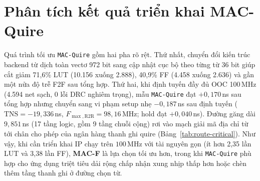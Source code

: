 \section{Phân tích kết quả triển khai MAC-Quire}

Quá trình tối ưu \texttt{MAC-Quire} gồm hai pha rõ rệt. Thứ nhất, chuyển đổi kiến
trúc backend từ dịch toàn vectơ 972 bit sang cập nhật cục bộ theo từng từ 36 bit
giúp cắt giảm 71,6\% LUT (10.156 xuống 2.888), 40,9\% FF (4.458 xuống 2.636) và
gần một nửa độ trễ F2F sau tổng hợp. Thứ hai, khi định tuyến đầy đủ OOC 100\,MHz
(4.594 net sạch, 0 lỗi DRC nghiêm trọng), mẫu \texttt{MAC-Quire} đạt $+0{,}170$\,ns
sau tổng hợp nhưng chuyển sang vi phạm setup nhẹ $-0{,}187$\,ns sau định tuyến
($\mathrm{TNS}=-19{,}336$\,ns, $F_{\max,\mathrm{R2R}} = 98{,}16$\,MHz; hold đạt
$+0{,}040$\,ns). Đường găng dài $9{,}851$\,ns (17 tầng logic, gồm 9 tầng chuỗi cộng)
rơi vào mạch giải mã địa chỉ từ tới chân cho phép của ngân hàng thanh ghi quire
(Bảng~\ref{tab:route-critical}). Như vậy, khi cần triển khai IP chạy trên $100$\,MHz
với tài nguyên gọn (ít hơn 2,35 lần LUT và 3,38 lần FF), \textbf{MAC-F} là lựa chọn
tối ưu hơn, trong khi \texttt{MAC-Quire} phù hợp cho ứng dụng triệt tiêu dải rộng
chấp nhận xung nhịp thấp hơn hoặc chèn thêm tầng thanh ghi ở đường chọn từ.
